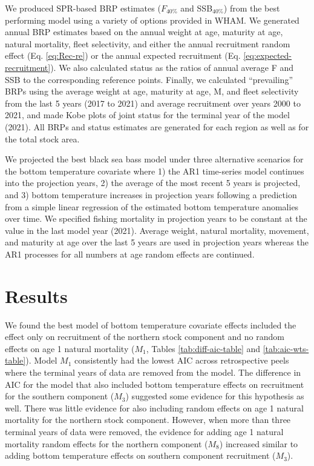 \documentclass[
]{article}
\begin{document}
We produced SPR-based BRP estimates (\(F_{40\%}\) and SSB\(_{40\%}\)) from the best performing model using a variety of options provided in WHAM. We generated annual BRP estimates based on the annual weight at age, maturity at age, natural mortality, fleet selectivity, and either the annual recruitment random effect (Eq. \ref{eq:Rec-re}) or the annual expected recruitment (Eq. \ref{eq:expected-recruitment}). We also calculated status as the ratios of annual average F and SSB to the corresponding reference points. Finally, we calculated ``prevailing'' BRPs using the average weight at age, maturity at age, M, and fleet selectivity from the last 5 years (2017 to 2021) and average recruitment over years 2000 to 2021, and made Kobe plots of joint status for the terminal year of the model (2021). All BRPs and status estimates are generated for each region as well as for the total stock area.

We projected the best black sea bass model under three alternative scenarios for the bottom temperature covariate where 1) the AR1 time-series model continues into the projection years, 2) the average of the most recent 5 years is projected, and 3) bottom temperature increases in projection years following a prediction from a simple linear regression of the estimated bottom temperature anomalies over time. We specified fishing mortality in projection years to be constant at the value in the last model year (2021). Average weight, natural mortality, movement, and maturity at age over the last 5 years are used in projection years whereas the AR1 processes for all numbers at age random effects are continued.

\hypertarget{results}{%
\section*{Results}\label{results}}

We found the best model of bottom temperature covariate effects included the effect only on recruitment of the northern stock component and no random effects on age 1 natural mortality (\(M_1\), Tables \ref{tab:diff-aic-table} and \ref{tab:aic-wts-table}). Model \(M_1\) consistently had the lowest AIC across retrospective peels where the terminal years of data are removed from the model. The difference in AIC for the model that also included bottom temperature effects on recruitment for the southern component (\(M_3\)) suggested some evidence for this hypothesis as well. There was little evidence for also including random effects on age 1 natural mortality for the northern stock component. However, when more than three terminal years of data were removed, the evidence for adding age 1 natural mortality random effects for the northern component (\(M_8\)) increased similar to adding bottom temperature effects on southern component recruitment (\(M_3\)).
\end{document}
